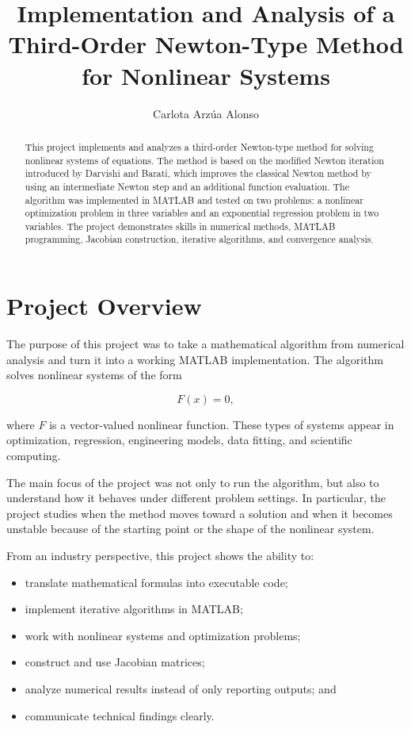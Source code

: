 \documentclass[11pt]{article}
\title{\textbf{Implementation and Analysis of a Third-Order Newton-Type Method for Nonlinear Systems}}
\author{Carlota Arz\'ua Alonso}
\date{}
\begin{document}
\maketitle

\begin{abstract}
This project implements and analyzes a third-order Newton-type method for solving nonlinear systems of equations. The method is based on the modified Newton iteration introduced by Darvishi and Barati, which improves the classical Newton method by using an intermediate Newton step and an additional function evaluation. The algorithm was implemented in MATLAB and tested on two problems: a nonlinear optimization problem in three variables and an exponential regression problem in two variables. The project demonstrates skills in numerical methods, MATLAB programming, Jacobian construction, iterative algorithms, and convergence analysis.
\end{abstract}

\section{Project Overview}

The purpose of this project was to take a mathematical algorithm from numerical analysis and turn it into a working MATLAB implementation. The algorithm solves nonlinear systems of the form

\begin{equation}
    F(x) = 0,
\end{equation}

where $F$ is a vector-valued nonlinear function. These types of systems appear in optimization, regression, engineering models, data fitting, and scientific computing.

The main focus of the project was not only to run the algorithm, but also to understand how it behaves under different problem settings. In particular, the project studies when the method moves toward a solution and when it becomes unstable because of the starting point or the shape of the nonlinear system.

From an industry perspective, this project shows the ability to:

\begin{itemize}[leftmargin=*]
    \item translate mathematical formulas into executable code;
    \item implement iterative algorithms in MATLAB;
    \item work with nonlinear systems and optimization problems;
    \item construct and use Jacobian matrices;
    \item analyze numerical results instead of only reporting outputs; and
    \item communicate technical findings clearly.
\end{itemize}
\end{document}

